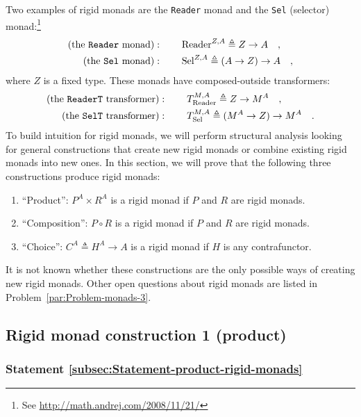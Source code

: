 Two examples of rigid monads are the \lstinline!Reader! monad and
the \lstinline!Sel! (selector)
monad:\footnote{See \href{http://math.andrej.com/2008/11/21/}{http://math.andrej.com/2008/11/21/}}
\begin{align*}
\text{(the \texttt{Reader} monad)} & :\quad\quad\text{Reader}^{Z,A}\triangleq Z\rightarrow A\quad,\\
\text{(the \texttt{Sel} monad)} & :\quad\quad\text{Sel}^{Z,A}\triangleq\left(A\rightarrow Z\right)\rightarrow A\quad,
\end{align*}
where $Z$ is a fixed type. These monads have composed-outside transformers:
\begin{align*}
\text{(the \texttt{ReaderT} transformer)} & :\quad\quad T_{\text{Reader}}^{M,A}\triangleq Z\rightarrow M^{A}\quad,\\
\text{(the \texttt{SelT} transformer)} & :\quad\quad T_{\text{Sel}}^{M,A}\triangleq(M^{A}\rightarrow Z)\rightarrow M^{A}\quad.
\end{align*}
To build intuition for rigid monads, we will perform structural analysis
looking for general constructions that create new rigid monads or
combine existing rigid monads into new ones. In this section, we will
prove that the following three constructions produce rigid monads:
\begin{enumerate}
\item \textsf{``}Product\textsf{''}: $P^{A}\times R^{A}$ is a rigid monad if $P$ and $R$
are rigid monads.
\item \textsf{``}Composition\textsf{''}: $P\circ R$ is a rigid monad if $P$ and $R$ are
rigid monads.
\item \textsf{``}Choice\textsf{''}: $C^{A}\triangleq H^{A}\rightarrow A$ is a rigid monad
if $H$ is any contrafunctor.
\end{enumerate}
It is not known whether these constructions are the only possible
ways of creating new rigid monads. Other open questions about rigid
monads are listed in Problem~\ref{par:Problem-monads-3}.

\subsection{Rigid monad construction 1 (product)}

\subsubsection{Statement \label{subsec:Statement-product-rigid-monads}\ref{subsec:Statement-product-rigid-monads}}

